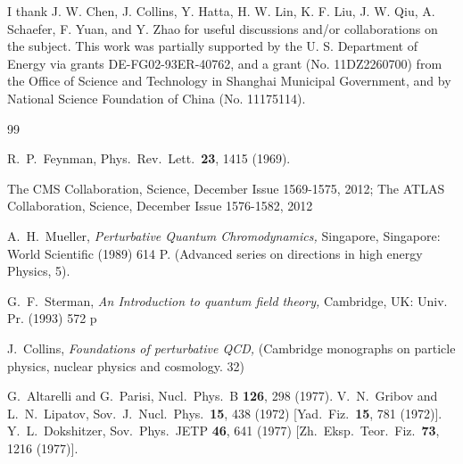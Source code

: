 I thank J. W. Chen, J. Collins, Y. Hatta, H. W. Lin, K. F. Liu, J. W. Qiu, A. Schaefer, F. Yuan, and Y. Zhao for useful
discussions and/or collaborations on the subject. This work was partially supported by the U.
S. Department of Energy via grants DE-FG02-93ER-40762, and a grant (No. 11DZ2260700) from the Office of
Science and Technology in Shanghai Municipal Government, and by National Science Foundation of China (No. 11175114).

\begin{thebibliography}{99}

  R.~P.~Feynman,
  Phys.\ Rev.\ Lett.\  {\bf 23}, 1415 (1969).

The CMS Collaboration, Science,  December Issue 1569-1575, 2012;
The ATLAS Collaboration, Science, December Issue 1576-1582, 2012

  A.~H.~Mueller,
{\it Perturbative Quantum Chromodynamics,}
  Singapore, Singapore: World Scientific (1989) 614 P. (Advanced series on directions in high energy Physics, 5).

  G.~F.~Sterman,
{\it An Introduction to quantum field theory,}
  Cambridge, UK: Univ. Pr. (1993) 572 p

  J.~Collins,
{\it  Foundations of perturbative QCD,}
  (Cambridge monographs on particle physics, nuclear physics and cosmology. 32)

  G.~Altarelli and G.~Parisi,
  Nucl.\ Phys.\ B {\bf 126}, 298 (1977).
  V.~N.~Gribov and L.~N.~Lipatov,
  Sov.\ J.\ Nucl.\ Phys.\  {\bf 15}, 438 (1972)
  [Yad.\ Fiz.\  {\bf 15}, 781 (1972)].
  Y.~L.~Dokshitzer,
  Sov.\ Phys.\ JETP {\bf 46}, 641 (1977)
  [Zh.\ Eksp.\ Teor.\ Fiz.\  {\bf 73}, 1216 (1977)].



\end{thebibliography}
